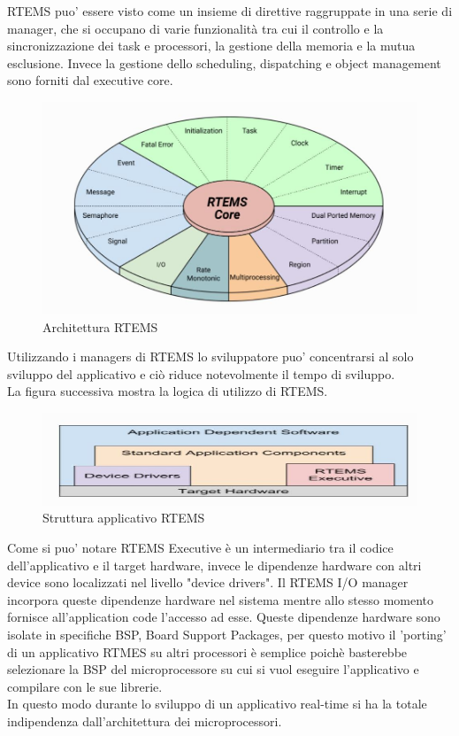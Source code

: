 \documentclass[12pt, a4paper, titlepage, oneside]{book}
\begin{document}
\begin{flushleft}
\newpage
RTEMS puo' essere visto come un insieme di direttive raggruppate in una serie di manager, che si occupano di varie funzionalità tra cui il controllo e la sincronizzazione dei task e processori, la gestione della memoria e la mutua esclusione. Invece la gestione dello scheduling, dispatching e object management sono forniti dal executive core.
\begin{figure} [h]
    \centering
    \includegraphics[scale = 0.80]{rtems_internal_architecture.JPG}
    \caption{Architettura RTEMS}
    \label{fig:my_label1}
\end{figure}

Utilizzando i managers di RTEMS lo sviluppatore puo' concentrarsi al solo sviluppo del applicativo e ciò riduce notevolmente il tempo di sviluppo.\\

La figura successiva mostra la logica di utilizzo di RTEMS.
\begin{figure}[ht]
    \centering
    \includegraphics[scale = 0.80]{application_architecture.JPG}
    \caption{Struttura applicativo RTEMS}
    \label{fig:my_label2}
\end{figure}

Come si puo' notare RTEMS Executive è un intermediario tra il codice dell'applicativo e il target hardware, invece le dipendenze hardware con altri device sono localizzati nel livello "device drivers".
Il RTEMS I/O manager incorpora queste dipendenze hardware nel sistema mentre allo stesso momento fornisce all'application code l'accesso ad esse.
Queste dipendenze hardware sono isolate in specifiche BSP, Board Support Packages, per questo motivo il 'porting' di un applicativo RTMES su altri processori è semplice poichè basterebbe selezionare la BSP del microprocessore su cui si vuol eseguire l'applicativo e compilare con le sue librerie.\\
In questo modo durante lo sviluppo di un applicativo real-time si ha la totale indipendenza dall'architettura dei microprocessori. \\


\end{flushleft}
\end{document}
